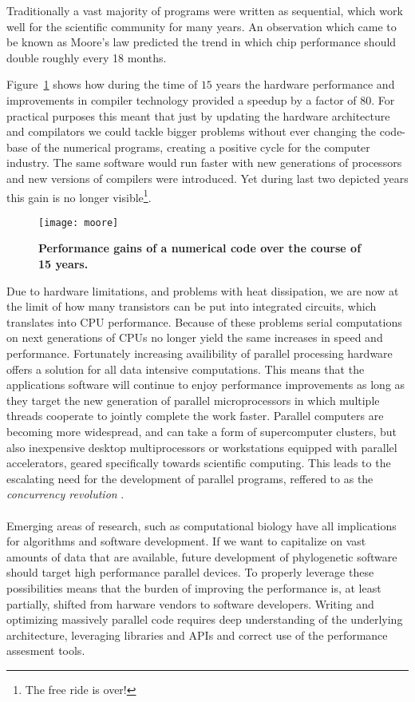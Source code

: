 Traditionally a vast majority of programs were written as sequential, which work well for the scientific community for many years.
An observation which came to be known as Moore's law predicted the trend in which chip performance should double roughly every 18 months.

Figure~\ref{fig:moore} shows how during the time of $15$ years the hardware performance and improvements in compiler technology provided a speedup by a factor of 80.
For practical purposes this meant that just by updating the hardware architecture and compilators we could tackle bigger problems without ever changing the code-base of the numerical programs, creating a positive cycle for the
computer industry.
The same software would run faster with new generations of processors and new versions of compilers were introduced.
Yet during last two depicted years this gain is no longer visible\footnote{The free ride is over!}.

\begin{figure}[H]
\centering
\texttt{[image: moore]}
\caption{
{ \footnotesize 
{\bf Performance gains of a numerical code over the course of 15 years.}
} %
}
\label{fig:moore}
\end{figure}

Due to hardware limitations, and problems with heat dissipation, we are now at the limit of how many transistors can be put into integrated circuits, which translates into CPU performance.
Because of these problems serial computations on next generations of CPUs no longer yield the same increases in speed and performance.
Fortunately increasing availibility of parallel processing hardware offers a solution for all data intensive computations.
This means that the applications software will continue to enjoy performance improvements as long as they target the new generation of parallel microprocessors in which multiple threads cooperate to jointly complete the work faster.
Parallel computers are becoming more widespread, and can take a form of supercomputer clusters, but also inexpensive desktop multiprocessors or workstations equipped with parallel accelerators, geared specifically towards scientific computing.
This leads to the escalating need for the development of parallel programs, reffered to as the \textit{concurrency revolution} \citep{Sutter2005}.

\paragraph{}
Emerging areas of research, such as computational biology have all implications for algorithms and software development.
If we want to capitalize on vast amounts of data that are available, future development of phylogenetic software should target high performance parallel devices.
To properly leverage these possibilities means that the burden of improving the performance is, at least partially, shifted from harware vendors to software developers.
Writing and optimizing massively parallel code requires deep understanding of the underlying architecture, leveraging libraries and APIs and correct use of the performance assesment tools.

